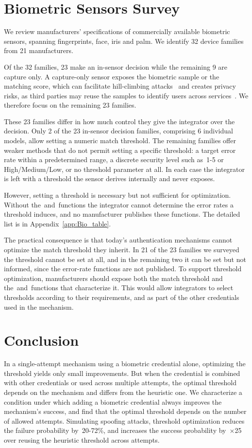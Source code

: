 \documentclass[conference,compsoc]{IEEEtran}
\begin{document}
\section{Biometric Sensors Survey}
\label{sec:sensors_review}
\noindent
We review manufacturers' specifications of commercially available biometric sensors, spanning fingerprints, face, iris and palm.
We identify 32 device families from 21 manufacturers.

Of the 32 families, 23 make an in-sensor decision while the remaining 9 are capture only.
A capture-only sensor exposes the biometric sample or the matching score, which can facilitate hill-climbing attacks~\cite{Bringer2018PrivateByDesign} and creates privacy risks, as third parties may reuse the samples to identify users across services~\cite{FIDOPrivacyPrinciples}.
We therefore focus on the remaining 23 families.

These 23 families differ in how much control they give the integrator over the decision.
Only 2 of the 23 in-sensor decision families, comprising 6 individual models, allow setting a numeric match threshold.
The remaining families offer weaker methods that do not permit setting a specific threshold: a target error rate within a predetermined range, a discrete security level such as~1-5 or High/Medium/Low, or no threshold parameter at all.
In each case the integrator is left with a threshold the sensor derives internally and never exposes.

However, setting a threshold is necessary but not sufficient for optimization. 
Without the~\FAR and~\FRR functions the integrator cannot determine the error rates a threshold induces, and no manufacturer publishes these functions.
The detailed list is in Appendix~\ref{app:Bio_table}.

The practical consequence is that today's authentication mechanisms cannot optimize the match threshold they inherit.
In 21 of the 23 families we surveyed the threshold cannot be set at all, and in the remaining two it can be set but not informed, since the error-rate functions are not published.
To support threshold optimization, manufacturers should expose both the match threshold and the~\FAR and~\FRR functions that characterize it.
This would allow integrators to select thresholds according to their requirements, and as part of the other credentials used in the mechanism.

\section{Conclusion}\label{sec:conclusion}
\noindent
In a single-attempt mechanism using a biometric credential alone, optimizing the threshold yields only small improvements. But when the credential is combined with other credentials or used across multiple attempts, the optimal threshold depends on the mechanism and differs from the heuristic one. We characterize a condition under which adding a biometric credential always improves the mechanism’s success, and find that the optimal threshold depends on the number of allowed attempts. Simulating spoofing attacks, threshold optimization reduces the failure probability by~20-72\%, and increases the success probability by~$\times$25 over reusing the heuristic threshold across attempts.
\end{document}
